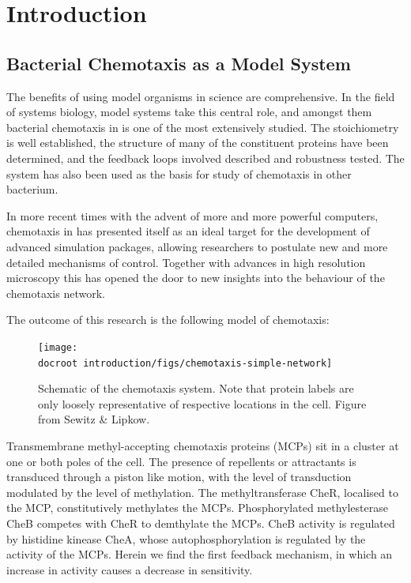 \documentclass[../main.tex]{subfiles}
\begin{document}
\section{Introduction}

\subsection{Bacterial Chemotaxis as a Model System}
The benefits of using model organisms in science are comprehensive. In the field of systems biology, model systems take this central role, and amongst them bacterial chemotaxis in \ecoli is one of the most extensively studied. The stoichiometry is well established\cite{li04}, the structure of many of the constituent proteins have been determined\cite{milligan87, stock89}, and the feedback loops involved described\cite{kentner09} and robustness tested\cite{yi00}. The \ecoli system has also been used as the basis for study of chemotaxis in other bacterium\cite{hamadeh11}.

In more recent times with the advent of more and more powerful computers, chemotaxis in \ecoli has presented itself as an ideal target for the development of advanced simulation packages, allowing researchers to postulate new and more detailed mechanisms of control\cite{lipkow06}. Together with advances in high resolution microscopy\cite{greenfield09} this has opened the door to new insights into the behaviour of the \ecoli chemotaxis network.

The outcome of this research is the following model of chemotaxis:

\begin{figure}[h!]
\begin{center}
\texttt{[image: \\docroot introduction/figs/chemotaxis-simple-network]}
\caption{Schematic of the chemotaxis system. Note that protein labels are only loosely representative of respective locations in the cell. Figure from Sewitz \& Lipkow\cite{lipkowfigs}.}
\end{center}
\end{figure}

Transmembrane methyl-accepting chemotaxis proteins (MCPs) sit in a cluster at one or both poles of the cell. The presence of repellents or attractants is transduced through a piston like motion\cite{hall11}, with the level of transduction modulated by the level of methylation. The methyltransferase CheR, localised to the MCP, constitutively methylates the MCPs. Phosphorylated methylesterase CheB competes with CheR to demthylate the MCPs. CheB activity is regulated by histidine kinease CheA, whose autophosphorylation is regulated by the activity of the  MCPs. Herein we find the first feedback mechanism, in which an increase in activity causes a decrease in sensitivity.
\end{document}
